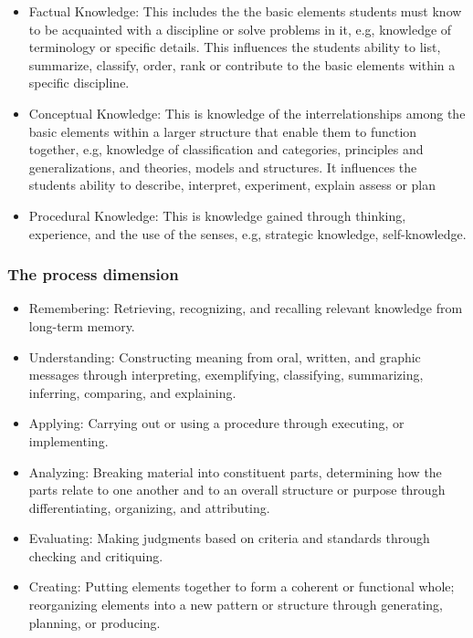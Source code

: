 \begin{itemize}
    \item Factual Knowledge: This includes the the basic elements students must know to be acquainted with a discipline or solve problems in it, e.g, knowledge of terminology or specific details. This influences the students ability to list, summarize, classify, order, rank or contribute to the basic elements within a specific discipline.
    \item Conceptual Knowledge: This is knowledge of the interrelationships among the basic elements within a larger structure that enable them to function together, e.g, knowledge of classification and categories, principles and generalizations, and theories, models and structures. It influences the students ability to describe, interpret, experiment, explain assess or plan
    \item Procedural Knowledge: This is knowledge gained through thinking, experience, and the use of the senses, e.g, strategic knowledge, self-knowledge.
\end{itemize}

\subsubsection{The process dimension}

\begin{itemize}
    \item Remembering: Retrieving, recognizing, and recalling relevant knowledge from long-term memory.
    \item Understanding: Constructing meaning from oral, written, and graphic messages through interpreting, exemplifying, classifying, summarizing, inferring, comparing, and explaining.
    \item Applying: Carrying out or using a procedure through executing, or implementing.
    \item Analyzing: Breaking material into constituent parts, determining how the parts relate to one another and to an overall structure or purpose through differentiating, organizing, and attributing.
    \item Evaluating: Making judgments based on criteria and standards through checking and critiquing.
    \item Creating: Putting elements together to form a coherent or functional whole; reorganizing elements into a new pattern or structure through generating, planning, or producing.
\end{itemize}

